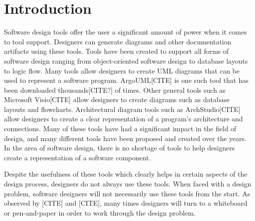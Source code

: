 \chapter{Introduction}

Software design tools offer the user a significant amount of power when it comes to tool support. 
Designers can generate diagrams and other documentation artifacts using these tools.
Tools have been created to support all forms of software design ranging from object-oriented software design to database layouts to logic flow.
Many tools allow designers to create UML diagrams that can be used to represent a software program. ArgoUML[CITE] is one such tool that has been downloaded thousands[CITE?] of times.
Other general tools such as Microsoft Visio[CITE] allow designers to create diagrams such as database layouts and flowcharts. 
Architectural diagram tools such as ArchStudio[CITE] allow designers to create a clear representation of a program's architecture and connections.
Many of these tools have had a significant impact in the field of design, and many different tools have been proposed and created over the years.
In the area of software design, there is no shortage of tools to help designers create a representation of a software component.

Despite the usefulness of these tools which clearly helps in certain aspects of the design process, designers do not always use these tools.
When faced with a design problem, software designers will not necessarily use these tools from the start. 
As observed by [CITE] and [CITE], many times designers will turn to a whiteboard or pen-and-paper in order to work through the design problem.

